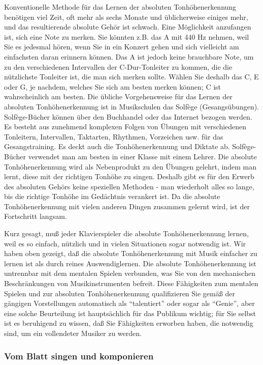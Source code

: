 Konventionelle Methode für das Lernen der absoluten Tonhöhenerkennung benötigen viel Zeit, oft mehr als sechs Monate und üblicherweise einiges mehr, und das resultierende absolute Gehör ist schwach.
Eine Möglichkeit anzufangen ist, sich eine Note zu merken.
Sie könnten z.B. das A mit 440 Hz nehmen, weil Sie es jedesmal hören, wenn Sie in ein Konzert gehen und sich vielleicht am einfachsten daran erinnern können.
Das A ist jedoch keine brauchbare Note, um zu den verschiedenen Intervallen der C-Dur-Tonleiter zu kommen, die die nützlichste Tonleiter ist, die man sich merken sollte.
Wählen Sie deshalb das C, E oder G, je nachdem, welches Sie sich am besten merken können; C ist wahrscheinlich am besten.
Die übliche Vorgehensweise für das Lernen der absoluten Tonhöhenerkennung ist in Musikschulen das Solfège (Gesangsübungen).
Solfège-Bücher können über den Buchhandel oder das Internet bezogen werden.
Es besteht aus zunehmend komplexen Folgen von Übungen mit verschiedenen Tonleitern, Intervallen, Taktarten, Rhythmen, Vorzeichen usw. für das Gesangstraining.
Es deckt auch die Tonhöhenerkennung und Diktate ab.
Solfège-Bücher verwendet man am besten in einer Klasse mit einem Lehrer.
Die absolute Tonhöhenerkennung wird als Nebenprodukt zu den Übungen gelehrt, indem man lernt, diese mit der richtigen Tonhöhe zu singen.
Deshalb gibt es für den Erwerb des absoluten Gehörs keine speziellen Methoden - man wiederholt alles so lange, bis die richtige Tonhöhe im Gedächtnis verankert ist.
Da die absolute Tonhöhenerkennung mit vielen anderen Dingen zusammen gelernt wird, ist der Fortschritt langsam.

Kurz gesagt, muß jeder Klavierspieler die absolute Tonhöhenerkennung lernen, weil es so einfach, nützlich und in vielen Situationen sogar notwendig ist.
Wir haben oben gezeigt, daß die absolute Tonhöhenerkennung mit Musik einfacher zu lernen ist als durch reines Auswendiglernen.
Die absolute Tonhöhenerkennung ist untrennbar mit dem mentalen Spielen verbunden, was Sie von den mechanischen Beschränkungen von Musikinstrumenten befreit.
Diese Fähigkeiten zum mentalen Spielen und zur absoluten Tonhöhenerkennung qualifizieren Sie gemäß der gängigen Vorstellungen automatisch als \enquote{talentiert} oder sogar als \enquote{Genie}, aber eine solche Beurteilung ist hauptsächlich für das Publikum wichtig; für Sie selbst ist es beruhigend zu wissen, daß Sie Fähigkeiten erworben haben, die notwendig sind, um ein vollendeter Musiker zu werden.


\subsubsection{Vom Blatt singen und komponieren}\hypertarget{c1iii12blatt}{}

